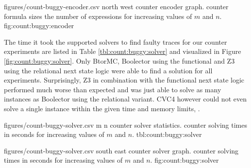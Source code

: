\newpage

\EncoderStatsGraph
  {figures/count-buggy-encoder.csv}
  {north west}
  { counter encoder graph.}
  { counter formula sizes  the number of expressions for increasing values of $m$ and $n$.}
  {fig:count:buggy:encoder}

The time it took the supported solvers to find faulty traces for our  counter experiments are listed in Table \ref{tbl:count:buggy:solver} and visualized in Figure \ref{fig:count:buggy:solver}.
Only BtorMC, Boolector using the functional and Z3 using the relational next state logic were able to find a solution for all experiments.
Surprisingly, Z3 in combination with the functional next state logic performed much worse than expected and was just able to solve as many instances as Boolector using the relational variant.
CVC4 however could not even solve a single instance within the given time and memory limits, .

\bigbreak

\SolverStatsTable
  {figures/count-buggy-solver.csv}
  {m n}
  {\CountRowHeader}
  { counter solver statistics.}
  { counter solving times in seconds for increasing values of $m$ and $n$.}
  {tbl:count:buggy:solver}

\newpage

\SolverStatsGraph
  {figures/count-buggy-solver.csv}
  {south east}
  { counter solver graph.}
  { counter solving times in seconds for increasing values of $m$ and $n$.}
  {fig:count:buggy:solver}


